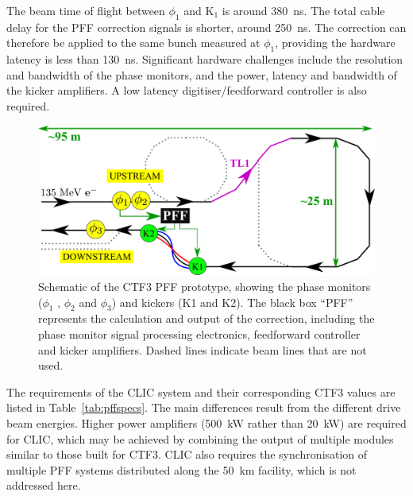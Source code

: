 \documentclass[%
 reprint,
 superscriptaddress,
 amsmath,
 amssymb,
 prl,
]{revtex4-1}
\begin{document}
The beam time of flight between \(\phi_1\) and \(\mathrm{K_1}\) is around 
380~ns. The total cable delay for the PFF correction signals 
is shorter, around 250~ns. The correction can therefore be applied to the same 
bunch measured at \(\phi_1\), providing the hardware latency is less than 
130~ns. Significant hardware challenges include the resolution and bandwidth of 
the phase monitors, and the power, latency and bandwidth of the kicker 
amplifiers. A low latency digitiser/feedforward controller is also required.
 
\begin{figure}
	\includegraphics[width=\columnwidth]{figs/alt/ctfpffLayout_tl1}%
	\caption{\label{fig:pffLayout}Schematic of the CTF3 PFF prototype, 
	showing the phase monitors (\(\phi_1\) , 
	\(\phi_2\) and \(\phi_3\)) and kickers (K1 and K2). The black box “PFF” 
	represents the calculation and output of the correction, including the 
	phase monitor signal processing electronics, feedforward controller and 
	kicker amplifiers. Dashed lines indicate beam lines that are not used. 
		}
\end{figure}

The requirements of the CLIC system and their corresponding CTF3 values are 
listed in Table~\ref{tab:pffspecs}. The main differences result from the 
different drive beam energies. Higher power 
amplifiers (500~kW rather than 20~kW) are required for CLIC, which may be 
achieved by combining the output of multiple modules similar to those built for 
CTF3. CLIC also requires the synchronisation of multiple PFF systems 
distributed along the 50~km facility, which is not addressed here.
\end{document}
